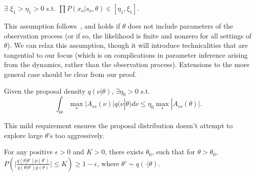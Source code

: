 \begin{assumption}
$\exists$ $ \xi_1 > \eta_1 > 0$ s.t. 
$\prod P(x_o | s_o, \theta) \in [\eta_1, \xi_1]$.
  \label{asmp:obs_bnd}
\end{assumption}
\noindent This assumption follows~\cite{miasojedow2017}, and holds if 
$\theta$ does not include parameters of the observation process (or if so,
the likelihood is finite and nonzero for all settings of $\theta$). We can relax this assumption,
though it will introduce technicalities that are tangential to our focus
(which is on complications in parameter inference arising from the 
dynamics, rather than the observation process). Extensions to the more 
general case should be clear from our proof.

\begin{assumption}
Given the proposal density $q(\nu | \theta)$, $\exists \eta_0 > 0$ s.t. $$ \int_\Theta \max_s|A_{ss}(\nu)| q(\nu | \theta)d\nu \leq \eta_0 \max_s|A_{ss}(\theta)|.$$
\end{assumption}
\noindent This mild requirement ensures the proposal distribution doesn't attempt
to explore large $\theta$'s too aggressively.

\begin{assumption}
For any positive $\epsilon > 0$ and $K > 0$, there exists $\theta_0$, such that for $\theta > \theta_0$, $P(\mid \frac{q(\theta | \theta')p(\theta')}{q(\theta | \theta')p(\theta)}\mid \leq K) \geq 1 - \epsilon$, where $\theta' \sim q(\cdot | \theta)$.
\end{assumption}


